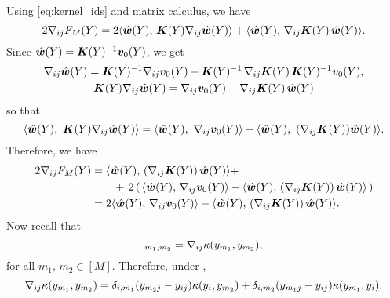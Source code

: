 Using \eqref{eq:kernel_ids} and matrix calculus, we have 
\begin{equation}\label{eq:gradient_optimal_mmd_identity}
    2\nabla_{ij} F_{M}(Y) = 2\langle \hat{\bm{w}}(Y),\,\bm{K}(Y)\nabla_{ij}\hat{\bm{w}}(Y)\rangle + \langle \hat{\bm{w}}(Y),\,\nabla_{ij}\bm{K}(Y)\,\hat{\bm{w}}(Y) \rangle .
\end{equation}
Since $\hat{\bm{w}}(Y) = \bm{K}(Y)^{-1}\bm{v}_{0}(Y) $, we get
\begin{gather}
\nabla_{ij} \hat{\bm{w}}(Y) = \bm{K}(Y)^{-1}\nabla_{ij} \bm{v}_{0}(Y) -\bm{K}(Y)^{-1}\,\nabla_{ij}\bm{K}(Y)\,\bm{K}(Y)^{-1}\bm{v}_{0}(Y),\\
\bm{K}(Y)\nabla_{ij}\hat{\bm{w}}(Y) = \nabla_{ij}\bm{v}_{0}(Y) - \nabla_{ij}\bm{K}(Y)\,\hat{\bm{w}}(Y)
\end{gather}
so that
\begin{equation}
    \langle\what,\ \Ky \nabla_{ij} \what\rangle = \langle\what,\ \nabla_{ij} \vzerov(\Y)\rangle -\langle \what,\ (\nabla_{ij}\Ky)\what\rangle.
\end{equation}
Therefore, we have
\begin{gather}\label{eq:grad_F_pi_first}
\begin{split}
2\nabla_{ij} F_{M}(Y) &= \langle \hat{\bm{w}}(Y),\, (\nabla_{ij}\bm{K}(Y))\,\hat{\bm{w}}(Y)\rangle +\\
&\qquad +\,2\left(\,\langle\hat{\bm{w}}(Y),\, \nabla_{ij}\bm{v}_0(Y)\rangle - \langle\hat{\bm{w}}(Y),\,(\nabla_{ij}\bm{K}(Y))\,\hat{\bm{w}}(Y)\rangle\,\right)\\
&= 2\langle \hat{\bm{w}}(Y),\,\nabla_{ij} \bm{v}_0(Y)\rangle - \langle\hat{\bm{w}}(Y),\,(\nabla_{ij}\bm{K}(Y))\,\hat{\bm{w}}(Y)\rangle.
\end{split}
\end{gather}
Now recall that
\begin{equation*}
    [\Dij\Ky]_{m_1,m_2} = \Dij\kappa(y_{m_1}, y_{m_2}),
\end{equation*}
for all $m_1,\,m_2 \in [M]$. Therefore, under ,
\begin{equation}
\nabla_{ij} \kappa(y_{m_1},y_{m_2}) = \delta_{i,m_1}(y_{m_2j} - y_{ij})\bar{\kappa}(y_{i},y_{m_2}) + \delta_{i,m_2}(y_{m_1j} - y_{ij})\bar{\kappa}(y_{m_1}, y_{i}).
\end{equation}

